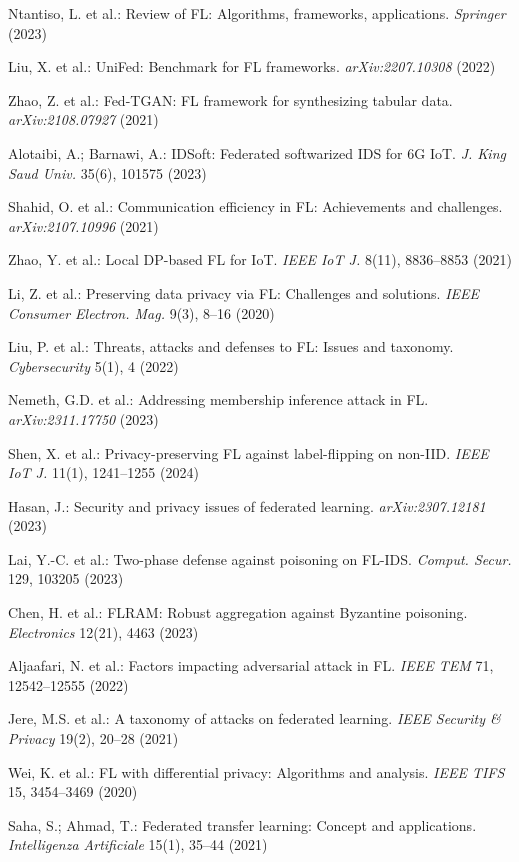 \documentclass[a4paper]{article}
\begin{document}
\begin{enumerate}[leftmargin=0.8cm, itemsep=0pt, parsep=0pt, label={[\arabic*]}]
\item Ntantiso, L. et al.: Review of FL: Algorithms, frameworks, applications. \textit{Springer} (2023)
\item Liu, X. et al.: UniFed: Benchmark for FL frameworks. \textit{arXiv:2207.10308} (2022)
\item Zhao, Z. et al.: Fed-TGAN: FL framework for synthesizing tabular data. \textit{arXiv:2108.07927} (2021)
\item Alotaibi, A.; Barnawi, A.: IDSoft: Federated softwarized IDS for 6G IoT. \textit{J. King Saud Univ.} 35(6), 101575 (2023)
\item Shahid, O. et al.: Communication efficiency in FL: Achievements and challenges. \textit{arXiv:2107.10996} (2021)
\item Zhao, Y. et al.: Local DP-based FL for IoT. \textit{IEEE IoT J.} 8(11), 8836--8853 (2021)
\item Li, Z. et al.: Preserving data privacy via FL: Challenges and solutions. \textit{IEEE Consumer Electron. Mag.} 9(3), 8--16 (2020)
\item Liu, P. et al.: Threats, attacks and defenses to FL: Issues and taxonomy. \textit{Cybersecurity} 5(1), 4 (2022)
\item Nemeth, G.D. et al.: Addressing membership inference attack in FL. \textit{arXiv:2311.17750} (2023)
\item Shen, X. et al.: Privacy-preserving FL against label-flipping on non-IID. \textit{IEEE IoT J.} 11(1), 1241--1255 (2024)
\item Hasan, J.: Security and privacy issues of federated learning. \textit{arXiv:2307.12181} (2023)
\item Lai, Y.-C. et al.: Two-phase defense against poisoning on FL-IDS. \textit{Comput. Secur.} 129, 103205 (2023)
\item Chen, H. et al.: FLRAM: Robust aggregation against Byzantine poisoning. \textit{Electronics} 12(21), 4463 (2023)
\item Aljaafari, N. et al.: Factors impacting adversarial attack in FL. \textit{IEEE TEM} 71, 12542--12555 (2022)
\item Jere, M.S. et al.: A taxonomy of attacks on federated learning. \textit{IEEE Security \& Privacy} 19(2), 20--28 (2021)
\item Wei, K. et al.: FL with differential privacy: Algorithms and analysis. \textit{IEEE TIFS} 15, 3454--3469 (2020)
\item Saha, S.; Ahmad, T.: Federated transfer learning: Concept and applications. \textit{Intelligenza Artificiale} 15(1), 35--44 (2021)

\end{enumerate}
\end{document}
